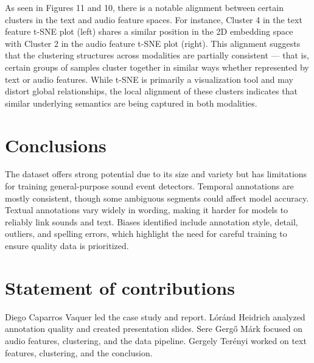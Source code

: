\documentclass{article}
\begin{document}
As seen in Figures 11 and 10, there is a notable alignment between certain clusters in the text and audio feature spaces. For instance, Cluster 4 in the text feature t-SNE plot (left) shares a similar position in the 2D embedding space with Cluster 2 in the audio feature t-SNE plot (right). This alignment suggests that the clustering structures across modalities are partially consistent — that is, certain groups of samples cluster together in similar ways whether represented by text or audio features. While t-SNE is primarily a visualization tool and may distort global relationships, the local alignment of these clusters indicates that similar underlying semantics are being captured in both modalities.

\section{Conclusions}
\label{sec:conclusions}

The dataset offers strong potential due to its size and variety but has limitations for training general-purpose sound event detectors. Temporal annotations are mostly consistent, though some ambiguous segments could affect model accuracy. Textual annotations vary widely in wording, making it harder for models to reliably link sounds and text. Biases identified include annotation style, detail, outliers, and spelling errors, which highlight the need for careful training to ensure quality data is prioritized.

\section{Statement of contributions}
Diego Caparros Vaquer led the case study and report. Lóránd Heidrich analyzed annotation quality and created presentation slides. Sere Gergő Márk focused on audio features, clustering, and the data pipeline. Gergely Terényi worked on text features, clustering, and the conclusion.
\end{document}
